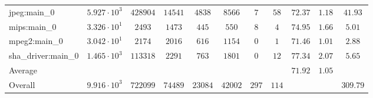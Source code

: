 \begin{tabular}{|l|c|c|c|c|c|c|c|c|c|c|}
jpeg:main\_0            & $ 5.927 \cdot 10^{3} $ & $ 428904 $ & $ 14541 $ & $ 4838  $ & $ 8566  $ & $ 7   $ & $ 58  $ & $ 72.37       $ & $ 1.18    $ & $ 41.93   $ \\
mips:main\_0            & $ 3.326 \cdot 10^{1} $ & $ 2493   $ & $ 1473  $ & $ 445   $ & $ 550   $ & $ 8   $ & $ 4   $ & $ 74.95       $ & $ 1.66    $ & $ 5.01    $ \\
mpeg2:main\_0           & $ 3.042 \cdot 10^{1} $ & $ 2174   $ & $ 2016  $ & $ 616   $ & $ 1154  $ & $ 0   $ & $ 1   $ & $ 71.46       $ & $ 1.01    $ & $ 2.88    $ \\
sha\_driver:main\_0     & $ 1.465 \cdot 10^{3} $ & $ 113318 $ & $ 2291  $ & $ 763   $ & $ 1801  $ & $ 0   $ & $ 12  $ & $ 77.34       $ & $ 2.07    $ & $ 5.65    $ \\
\hline
Average                 & $                    $ & $        $ & $       $ & $       $ & $       $ & $     $ & $     $ & $ 71.92       $ & $ 1.05    $ & $         $ \\
\hline
Overall                 & $ 9.916 \cdot 10^{3} $ & $ 722099 $ & $ 74489 $ & $ 23084 $ & $ 42002 $ & $ 297 $ & $ 114 $ & $             $ & $         $ & $ 309.79  $ \\
\hline
\end{tabular}
